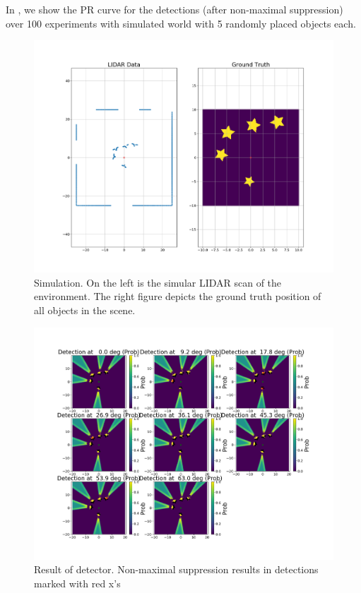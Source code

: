 In , we show the PR curve for the detections (after
non-maximal suppression) over 100 experiments with simulated world with 5
randomly placed objects each.
%
\begin{figure}
  \centering
  \includegraphics[width=\columnwidth]{figures/ground_truth.png}
  \caption{Simulation. On the left is the simular LIDAR scan of the environment.
    The right figure depicts the ground truth position of all objects in the
    scene.}
  \label{fig:sim_world}
\end{figure}
%
\begin{figure}
  \centering
  \includegraphics[width=\textwidth]{figures/detections.png}
  \caption{Result of detector. Non-maximal suppression results in detections
    marked with red x's}
  \label{fig:detector}
\end{figure}
